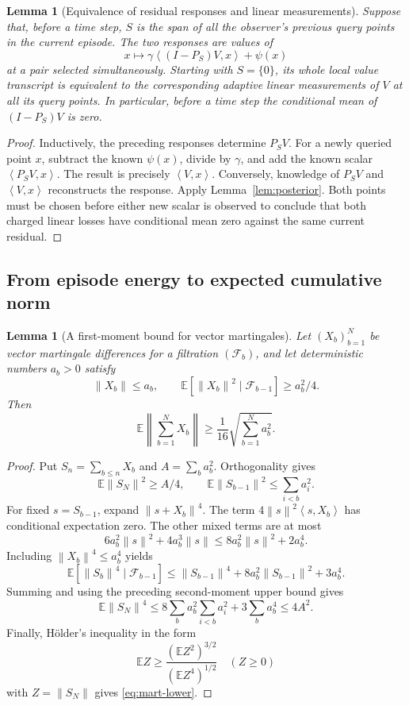 \documentclass[11pt,a4paper]{article}
\numberwithin{equation}{section}
\newtheorem{lemma}[theorem]{Lemma}
\theoremstyle{remark}
\newcommand{\E}{\mathbb E}
\newcommand{\norm}[1]{\left\lVert #1\right\rVert}
\newcommand{\ip}[2]{\left\langle #1,#2\right\rangle}
\begin{document}
\begin{lemma}[Equivalence of residual responses and linear measurements]
\label{lem:transcript}
Suppose that, before a time step, $S$ is the span of all the observer's
previous query points in the current episode. The two responses are
values of
\[
 x\longmapsto \gamma\ip{(I-P_S)V}{x}+\psi(x)
\]
at a pair selected simultaneously. Starting with $S=\{0\}$, its whole
local value transcript is equivalent to the corresponding adaptive
linear measurements of $V$ at all its query points. In particular,
before a time step the conditional mean of $(I-P_S)V$ is zero.
\end{lemma}
\begin{proof}
Inductively, the preceding responses determine $P_SV$. For a newly
queried point $x$, subtract the known $\psi(x)$, divide by $\gamma$,
and add the known scalar $\ip{P_SV}{x}$. The result is precisely
$\ip Vx$. Conversely, knowledge of $P_SV$ and $\ip Vx$ reconstructs the
response. Apply Lemma~\ref{lem:posterior}.
Both points must be chosen before either new scalar is observed to
conclude that both charged linear losses have conditional mean zero
against the same current residual.
\end{proof}

\subsection{From episode energy to expected cumulative norm}

\begin{lemma}[A first-moment bound for vector martingales]\label{lem:mart}
Let $(X_b)_{b=1}^N$ be vector martingale differences for a filtration
$(\mathcal F_b)$, and let deterministic numbers $a_b>0$ satisfy
\[
 \norm{X_b}\le a_b,\qquad
 \E[\norm{X_b}^2\mid\mathcal F_{b-1}]\ge a_b^2/4.
\]
Then
\begin{equation}
 \E\norm{\sum_{b=1}^N X_b}
 \ge\frac1{16}\sqrt{\sum_{b=1}^Na_b^2}.  \label{eq:mart-lower}
\end{equation}
\end{lemma}
\begin{proof}
Put $S_n=\sum_{b\le n}X_b$ and $A=\sum_ba_b^2$. Orthogonality gives
\[
 \E\norm{S_N}^2\ge A/4,\qquad
 \E\norm{S_{b-1}}^2\le\sum_{i<b}a_i^2.
\]
For fixed $s=S_{b-1}$, expand $\norm{s+X_b}^4$. The term
$4\norm s^2\ip s{X_b}$ has conditional expectation zero. The other
mixed terms are at most
\[
 6a_b^2\norm s^2+4a_b^3\norm s
 \le8a_b^2\norm s^2+2a_b^4.
\]
Including $\norm{X_b}^4\le a_b^4$ yields
\[
 \E[\norm{S_b}^4\mid\mathcal F_{b-1}]
 \le\norm{S_{b-1}}^4+8a_b^2\norm{S_{b-1}}^2+3a_b^4.
\]
Summing and using the preceding second-moment upper bound gives
\[
 \E\norm{S_N}^4
 \le8\sum_ba_b^2\sum_{i<b}a_i^2+3\sum_ba_b^4
 \le4A^2.
\]
Finally, H\"older's inequality in the form
\[
 \E Z\ge\frac{(\E Z^2)^{3/2}}{(\E Z^4)^{1/2}}
 \quad (Z\ge0)
\]
with $Z=\norm{S_N}$ gives \eqref{eq:mart-lower}.
\end{proof}
\end{document}
